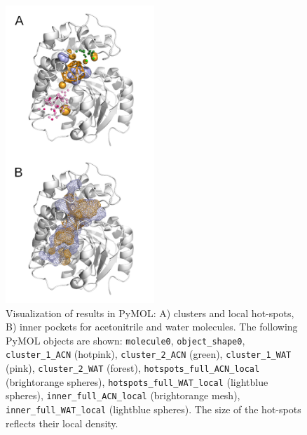 \documentclass[9pt,tutorial, pubversion]{livecoms}
\begin{document}
\begin{figure}[ht!]
\centering
\includegraphics[width=0.5\textwidth]{Tut6.3.png}
\caption{Visualization of results in PyMOL: A) clusters and local hot-spots, B) inner pockets for acetonitrile and water molecules. The following PyMOL objects are shown: \texttt{molecule0}, \texttt{object\_shape0}, \texttt{cluster\_1\_ACN} (hotpink), \texttt{cluster\_2\_ACN} (green), \texttt{cluster\_1\_WAT} (pink), \texttt{cluster\_2\_WAT} (forest), \texttt{hotspots\_full\_ACN\_local} (brightorange spheres), \texttt{hotspots\_full\_WAT\_local} (lightblue spheres), \texttt{inner\_full\_ACN\_local} (brightorange mesh), \texttt{inner\_full\_WAT\_local} (lightblue spheres). The size of the hot-spots reflects their local density.}
\label{Tut6.3}
\end{figure}
\end{document}

